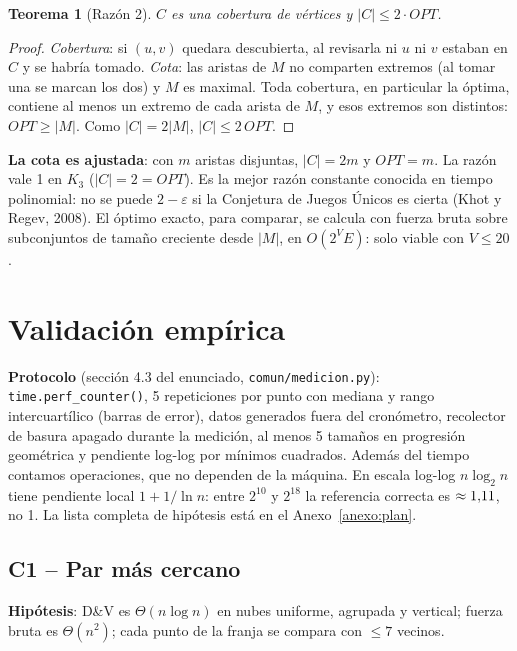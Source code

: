 \documentclass[11pt,letterpaper]{article}
\theoremstyle{plain}
\newtheorem{teorema}{Teorema}
\theoremstyle{definition}
\newcommand{\Th}{\Theta}
\begin{document}
\begin{teorema}[Razón 2]
$C$ es una cobertura de vértices y $|C|\le2\cdot OPT$.
\end{teorema}
\begin{proof}
\emph{Cobertura}: si $(u,v)$ quedara descubierta, al revisarla ni $u$ ni $v$ estaban en $C$ y se habría
tomado. \emph{Cota}: las aristas de $M$ no comparten extremos (al tomar una se marcan los dos) y $M$ es
maximal. Toda cobertura, en particular la óptima, contiene al menos un extremo de cada arista de $M$, y
esos extremos son distintos: $OPT\ge|M|$. Como $|C|=2|M|$, $|C|\le2\,OPT$.
\end{proof}

\textbf{La cota es ajustada}: con $m$ aristas disjuntas, $|C|=2m$ y $OPT=m$. La razón vale 1 en $K_3$
($|C|=2=OPT$). Es la mejor razón constante conocida en tiempo polinomial: no se puede $2-\varepsilon$
si la Conjetura de Juegos Únicos es cierta (Khot y Regev, 2008). El óptimo exacto, para comparar, se
calcula con fuerza bruta sobre subconjuntos de tamaño creciente desde $|M|$, en $O(2^V E)$: solo
viable con $V\le20$.
\section{Validación empírica}\label{sec:validacion}

\textbf{Protocolo} (sección 4.3 del enunciado, \texttt{comun/medicion.py}): \texttt{time.perf\_counter()},
5 repeticiones por punto con mediana y rango intercuartílico (barras de error), datos generados fuera del
cronómetro, recolector de basura apagado durante la medición, al menos 5 tamaños en progresión
geométrica y pendiente log-log por mínimos cuadrados. Además del tiempo contamos operaciones, que no
dependen de la máquina. En escala log-log $n\log_2 n$ tiene pendiente local $1+1/\ln n$: entre $2^{10}$ y
$2^{18}$ la referencia correcta es $\approx1{,}11$, no 1. La lista completa de hipótesis está en el
Anexo~\ref{anexo:plan}.

\subsection{C1 -- Par más cercano}
\textbf{Hipótesis}: D\&V es $\Th(n\log n)$ en nubes uniforme, agrupada y vertical; fuerza bruta es $\Th(n^2)$;
cada punto de la franja se compara con $\le7$ vecinos.
\end{document}
